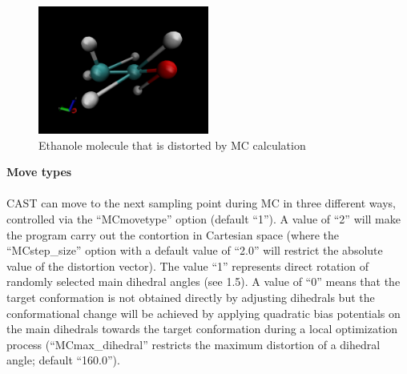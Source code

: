 \documentclass[10pt,a4paper]{article} %
\begin{document}
		\begin{figure}[htb]
		\centering
		\includegraphics[width=0.5\textwidth]{img/distorted_ethanol.png}
		\caption{Ethanole molecule that is distorted by MC calculation}
		\label{fig:dist_eth}
	\end{figure}
	
	\textbf{Move types}\\~\\
	\ac{CAST} can move to the next sampling point during \ac{MC} in three different ways, controlled via the ``MCmovetype'' option (default ``1''). A value of ``2'' will make the program carry out the contortion in Cartesian space (where the ``MCstep\_size'' option with a default value of ``2.0'' will restrict the absolute value of the distortion vector). The value ``1'' represents direct rotation of randomly selected main dihedral angles (see 1.5). A value of ``0'' means that the target conformation is not obtained directly by adjusting dihedrals but the conformational change will be achieved by applying quadratic bias potentials on the main dihedrals towards the target conformation during a local optimization process (``MCmax\_dihedral'' restricts the maximum distortion of a dihedral angle; default ``160.0''). \\
		
\end{document}
